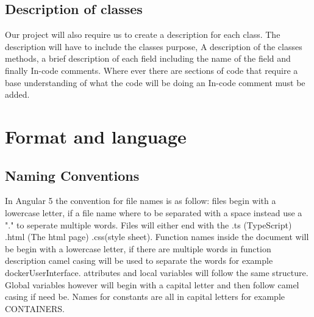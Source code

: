 \documentclass[a4paper]{article}
\begin{document}
\subsection{Description of classes}
Our project will also require us to create a description for each class. The description will have to include the classes purpose, A description of the classes methods, a brief description of each field including the name of the field and finally In-code comments. Where ever there are sections of code that require a base understanding of what the code will be doing an In-code comment must be added.  

\section{Format and language}
\subsection{Naming Conventions}
In Angular 5 the convention for file names is as follow: 
files begin with a lowercase letter, if a file name where to be separated with a space instead use a "." to seperate multiple words. Files will either end with the .ts (TypeScript) .html (The html page) .css(style sheet). Function names inside the document will be begin with a lowercase letter, if there are multiple words in function description camel casing will be used to separate the words for example dockerUserInterface. attributes and local variables will follow the same structure. Global variables however will begin with a capital letter and then follow camel casing if need be. Names for constants are all in capital letters for example CONTAINERS. 
\end{document}

